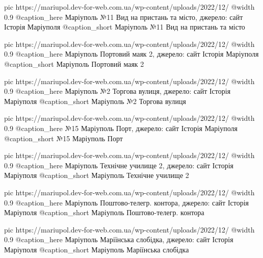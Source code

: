   pic https://mariupol.dev-for-web.com.ua/wp-content/uploads/2022/12/%
  @width 0.9
  @caption_here Маріуполь №11 Вид на пристань та місто, джерело: сайт Історія Маріуполя
  @caption_short Маріуполь №11 Вид на пристань та місто

  pic https://mariupol.dev-for-web.com.ua/wp-content/uploads/2022/12/%
  @width 0.9
  @caption_here Маріуполь Портовий маяк 2, джерело: сайт Історія Маріуполя
  @caption_short Маріуполь Портовий маяк 2

  pic https://mariupol.dev-for-web.com.ua/wp-content/uploads/2022/12/%
  @width 0.9
  @caption_here Маріуполь №2 Торгова вулиця, джерело: сайт Історія Маріуполя
  @caption_short Маріуполь №2 Торгова вулиця

  pic https://mariupol.dev-for-web.com.ua/wp-content/uploads/2022/12/%
  @width 0.9
  @caption_here №15 Маріуполь Порт, джерело: сайт Історія Маріуполя
  @caption_short №15 Маріуполь Порт

  pic https://mariupol.dev-for-web.com.ua/wp-content/uploads/2022/12/%
  @width 0.9
  @caption_here Маріуполь Технічне училище 2, джерело: сайт Історія Маріуполя
  @caption_short Маріуполь Технічне училище 2

  pic https://mariupol.dev-for-web.com.ua/wp-content/uploads/2022/12/%
  @width 0.9
  @caption_here Маріуполь Поштово-телегр. контора, джерело: сайт Історія Маріуполя
  @caption_short Маріуполь Поштово-телегр. контора

  pic https://mariupol.dev-for-web.com.ua/wp-content/uploads/2022/12/%
  @width 0.9
  @caption_here Маріуполь Маріїнська слобідка, джерело: сайт Історія Маріуполя
  @caption_short Маріуполь Маріїнська слобідка

